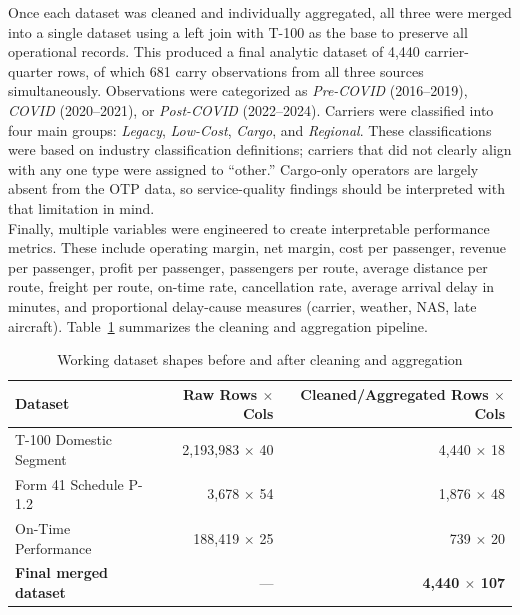 \documentclass[11pt, letterpaper]{article}
\begin{document}
\indent Once each dataset was cleaned and individually aggregated, all three were merged into a single dataset using a left join with T-100 as the base to preserve all operational records. This produced a final analytic dataset of 4,440 carrier-quarter rows, of which 681 carry observations from all three sources simultaneously. Observations were categorized as \textit{Pre-COVID} (2016--2019), \textit{COVID} (2020--2021), or \textit{Post-COVID} (2022--2024). Carriers were classified into four main groups: \textit{Legacy}, \textit{Low-Cost}, \textit{Cargo}, and \textit{Regional}. These classifications were based on industry classification definitions; carriers that did not clearly align with any one type were assigned to ``other.'' Cargo-only operators are largely absent from the OTP data, so service-quality findings should be interpreted with that limitation in mind.\\
\indent Finally, multiple variables were engineered to create interpretable performance metrics. These include operating margin, net margin, cost per passenger, revenue per passenger, profit per passenger, passengers per route, average distance per route, freight per route, on-time rate, cancellation rate, average arrival delay in minutes, and proportional delay-cause measures (carrier, weather, NAS, late aircraft). Table~\ref{tab:datasets} summarizes the cleaning and aggregation pipeline.

\begin{table}[H]
\centering
\caption{Working dataset shapes before and after cleaning and aggregation}
\label{tab:datasets}
\begin{tabular}{lrr}
\toprule
Dataset & Raw Rows $\times$ Cols & Cleaned/Aggregated Rows $\times$ Cols \\
\midrule
T-100 Domestic Segment & 2{,}193{,}983 $\times$ 40 & 4{,}440 $\times$ 18 \\
Form 41 Schedule P-1.2 & 3{,}678 $\times$ 54 & 1{,}876 $\times$ 48 \\
On-Time Performance & 188{,}419 $\times$ 25 & 739 $\times$ 20 \\
\midrule
\textbf{Final merged dataset} & --- & \textbf{4{,}440 $\times$ 107} \\
\bottomrule
\end{tabular}
\end{table}
\end{document}
